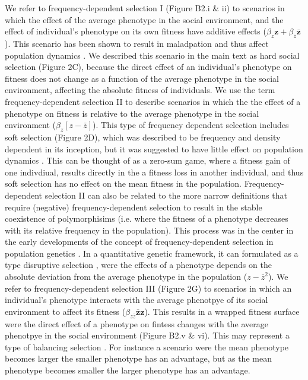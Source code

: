 \documentclass{article}
\begin{document}
We refer to frequency-dependent selection I (Figure B2.i \& ii) to scenarios in which the effect of the average phenotype in the social environment, and the effect of individual's phenotype on its own fitness have additive effects ($\beta_z \mathbf{z} + \beta_{\bar{z}} \mathbf{\bar{z}}$ ). This scenario has been shown to result in maladpation \citep{Lande1976} and thus affect population dynamics \citep{Lande2007}. We described this scenario in the main text as hard social selection (Figure 2C), because the direct effect of an individual's phenotype on fitness does not change as a function of the average phenotype in the social environment, affecting the absolute fitness of individuals. We use the term frequency-dependent selection II to describe scenarios in which the the effect of a phenotype on fitness is relative to the average phenotype in the social environment ($\beta_z [z-\bar{z}]$). This type of frequency dependent selection includes soft selection (Figure 2D), which was described to be frequency and density dependent in its inception, but it was suggested to have little effect on population dynamics \citep{Wallace1975, Bell2021}. This can be thought of as a zero-sum game, where a fitness gain of one indivdiual, results directly in the a fitness loss in another individual, and thus soft selection has no effect on the mean fitness in the population. Frequency-dependent selection II can also be related to the more narrow definitions that require (negative) frequency-dependent selection to result in the stable coexistence of polymorphisims (i.e. where the fitness of a phenotype decreases with its relative frequency in the population). This process was in the center in the early developments of the concept of frequency-dependent selection in population genetics \cite{Gromko1977, Ayala1974, Heino1998}. In a quantitative genetic framework, it can formulated as a type disruptive selection \citep{Burger2004}, were the effects of a phenotype depends on the absolute deviation from the average phenotype in the population ($z-\bar{z}^2$). We refer to frequency-dependent selection III (Figure 2G) to scenarios in which an individual's phenotype interacts with the average phenotpye of its social environment to affect its fitness ($\beta_{z\bar{z}} \mathbf{\bar{z}z}$). This results in a wrapped fitness surface were the direct effect of a phenotype on fintess changes with the average phenotpye in the social environment (Figure B2.v \& vi). This may represent a type of balancing selection \citep{Gromko1977}. For instance a scenario were the mean phenotype becomes larger the smaller phenotype has an advantage, but as the mean phenotype becomes smaller the larger phenotype has an advantage.
\end{document}
